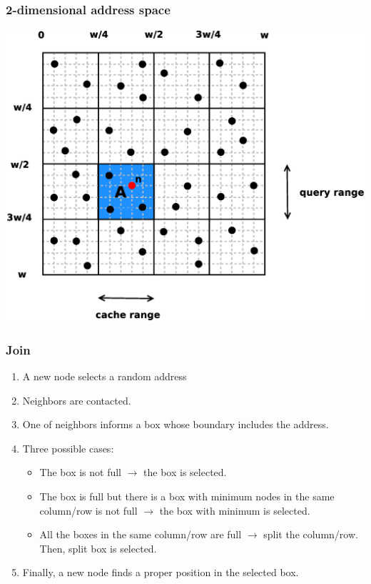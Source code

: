 \documentclass[red]{beamer}
\begin{document}
\begin{frame}
\frametitle{2-dimensional address space}
\begin{center}
\includegraphics[scale=0.2]{figs/ed2_space.eps}
\end{center}
\end{frame}

\begin{frame}
\frametitle{Join}
\begin{enumerate}
\item A new node selects a random address %
\item Neighbors are contacted.
\item One of neighbors informs a box 
whose boundary includes the address.
\item Three possible cases:
\begin{itemize}
\item The box is not full $\rightarrow$ the box is selected.
\item The box is full but there is a box with minimum nodes in the same column/row is not full $\rightarrow$ the box with minimum is selected. 
\item All the boxes in the same column/row are full $\rightarrow$ split the column/row. Then, split box is selected.
\end{itemize}
\item Finally, a new node finds a proper position in the selected box.
\end{enumerate}
\end{frame}
\end{document}
